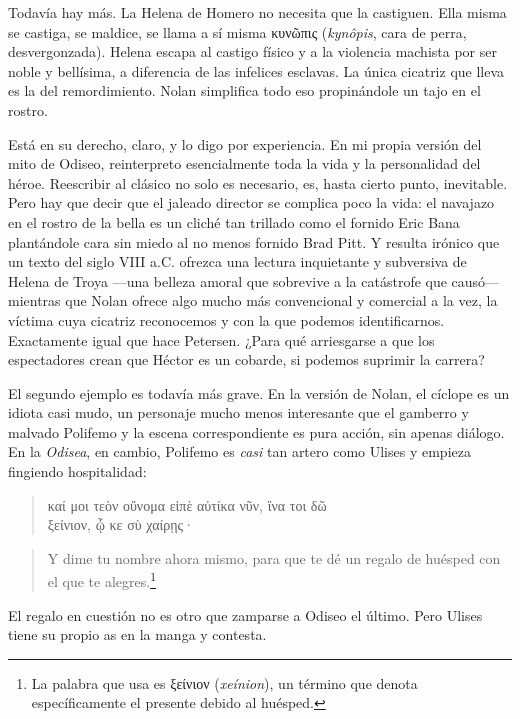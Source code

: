 \documentclass[11pt,a4paper]{article}
\newcommand{\gr}[1]{\foreignlanguage{greek}{#1}}
\begin{document}
Todavía hay más. La Helena de Homero no necesita que la castiguen. Ella misma se castiga, se maldice, se llama a sí misma \gr{κυνῶπις} (\emph{kynôpis}, cara de perra, desvergonzada). Helena escapa al castigo físico y a la violencia machista por ser noble y bellísima, a diferencia de las infelices esclavas. La única cicatriz que lleva es la del remordimiento. Nolan simplifica todo eso propinándole un tajo en el rostro.

Está en su derecho, claro, y lo digo por experiencia. En mi propia versión del mito de Odiseo, reinterpreto esencialmente toda la vida y la personalidad del héroe. Reescribir al clásico no solo es necesario, es, hasta cierto punto, inevitable. Pero hay que decir que el jaleado director se complica poco la vida: el navajazo en el rostro de la bella es un cliché tan trillado como el fornido Eric Bana plantándole cara sin miedo al no menos fornido Brad Pitt. Y resulta irónico que un texto del siglo VIII a.C. ofrezca una lectura inquietante y subversiva de Helena de Troya ---una belleza amoral que sobrevive a la catástrofe que causó--- mientras que Nolan ofrece algo mucho más convencional y comercial a la vez, la víctima cuya cicatriz reconocemos y con la que podemos identificarnos. Exactamente igual que hace Petersen. ¿Para qué arriesgarse a que los espectadores crean que Héctor es un cobarde, si podemos suprimir la carrera? 

El segundo ejemplo es todavía más grave. En la versión de Nolan, el cíclope es un idiota casi mudo, un personaje mucho menos interesante que el gamberro y malvado Polifemo y la escena correspondiente es pura acción, sin apenas diálogo. En la \emph{Odisea}, en cambio, Polifemo es \emph{casi} tan artero como Ulises y empieza fingiendo hospitalidad:

\begin{verse}
\foreignlanguage{greek}{καί μοι τεὸν οὔνομα εἰπὲ αὐτίκα νῦν, ἵνα τοι δῶ\\
ξείνιον, ᾧ κε σὺ χαίρῃς·}
\end{verse}

\begin{verse}
Y dime tu nombre ahora mismo, para que te dé un regalo de huésped con el que te alegres.\footnote{La palabra que usa es \gr{ξείνιον} (\emph{xeínion}), un término que denota específicamente el presente debido al huésped.}
\end{verse}

El regalo en cuestión no es otro que zamparse a Odiseo el último. Pero Ulises tiene su propio as en la manga y contesta.
\end{document}
